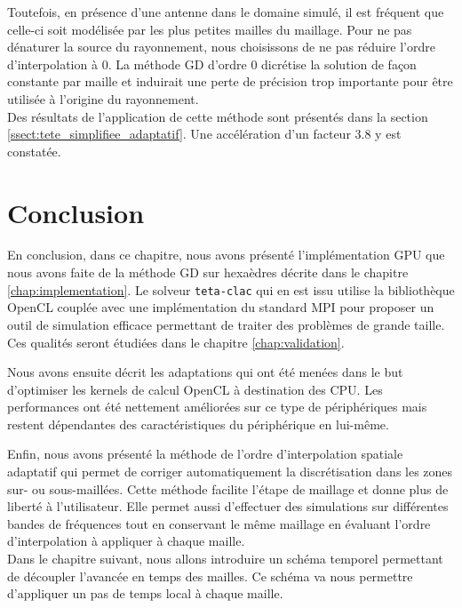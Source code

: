 Toutefois, en présence d'une antenne dans le domaine
simulé, il est fréquent que celle-ci soit modélisée par les plus petites
mailles du maillage. Pour ne pas dénaturer la source du rayonnement, nous choisissons de ne pas réduire l'ordre d'interpolation à $0$.
La méthode GD d'ordre $0$ dicrétise la solution de façon
constante par maille et induirait une perte de précision trop
importante pour être utilisée à l'origine du rayonnement.
\\

Des résultats de l'application de cette méthode sont présentés
dans la section \ref{ssect:tete_simplifiee_adaptatif}.
Une accélération d'un facteur $3.8$ y est constatée.
\\


\section*{Conclusion}


En conclusion, dans ce chapitre, nous avons présenté l'implémentation GPU
que nous avons faite de la méthode GD sur hexaèdres décrite dans le chapitre
\ref{chap:implementation}.
Le solveur \texttt{teta-clac} qui en est issu utilise la bibliothèque OpenCL
couplée avec une implémentation du standard MPI pour proposer
un outil de simulation efficace permettant de traiter des
problèmes de grande taille.
Ces qualités seront étudiées dans le chapitre \ref{chap:validation}.

Nous avons ensuite décrit les adaptations qui ont été menées dans le
but d'optimiser les kernels de calcul OpenCL à destination des CPU.
Les performances ont été nettement améliorées sur ce type
de périphériques mais restent dépendantes des caractéristiques
du périphérique en lui-même.

Enfin, nous avons présenté la méthode de l'ordre d'interpolation
spatiale adaptatif qui permet de corriger automatiquement la discrétisation
dans les zones sur- ou sous-maillées.
Cette méthode facilite l'étape de maillage et donne plus
de liberté à l'utilisateur. Elle permet aussi d'effectuer des
simulations sur différentes bandes de fréquences tout en conservant
le même maillage en évaluant l'ordre d'interpolation à appliquer à chaque maille.
\\

Dans le chapitre suivant, nous allons introduire un schéma temporel
permettant de découpler l'avancée en temps des mailles.
Ce schéma va nous permettre d'appliquer un pas de temps local à chaque maille.







